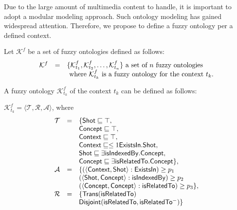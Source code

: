			Due to the large amount of multimedia content to handle, it is important to adopt a 
			modular modeling approach. Such ontology modeling has gained widespread attention. 
			Therefore, we propose to define a fuzzy ontology per a defined context.

			Let $\mathcal{K}^{f}$ be a set of fuzzy ontologies defined as follows:
			\begin{equation}
				\begin{array}{ c c l }
					\mathcal{K}^{f} & = &  \{\mathcal{K}^{f}_{t_{1}},\mathcal{K}^{f}_{t_{2}}, 
					\ldots, \mathcal{K}^{f}_{t_{n}}\} \text{ a set of $n$ fuzzy ontologies }  \\
					& &  \text{ where } \mathcal{K}^{f}_{t_{k}} \text{ is a fuzzy ontology for the context } t_{k}.
				\end{array}
			\end{equation}
			
			\begin{definition}
				A fuzzy ontology $\mathcal{K}^{f}_{t_{k}}$ of the context $t_{k}$ can be defined as follows: 

				$\mathcal{K}^{f}_{t_{k}} = \langle \mathcal{T}, \mathcal{R}, \mathcal{A} \rangle$, where
				{
					\begin{equation}
						\begin{array}{ c c l }
							\mathcal{T}  	& = 	& \{\mathsf{Shot} \sqsubseteq \top,\\
							&	& \mathsf{Concept} \sqsubseteq \top,\\
							&	& \mathsf{Context} \sqsubseteq \top,\\
							&	& \mathsf{Context}\sqsubseteq\leq{}1\mathsf{ExistsIn.Shot},\\
							&	& \mathsf{Shot}\sqsubseteq\exists\mathsf{isIndexedBy.Concept},\\
							&	& \mathsf{Concept} \sqsubseteq \exists{}\mathsf{isRelatedTo.Concept}\},\\
							\mathcal{A}	& = 	&
							\{(\langle{}\mathsf{Context},\mathsf{Shot}\rangle:\mathsf{ExistsIn})\geq
							p_{1}\\
							&	& (\langle{}\mathsf{Shot},\mathsf{Concept}\rangle:
							\mathsf{isIndexedBy}) \geq	p_{2}\\
							&	& (\langle{}\mathsf{Concept},\mathsf{Concept}\rangle:\mathsf{isRelatedTo})
							\geq p_{3}\},\\
							\mathcal{R} 	& =	& \{\mathsf{Trans(isRelatedTo)} \\
							&	& \mathsf{Disjoint(isRelatedTo,isRelatedTo^{-})}\}
						\end{array}
					\end{equation}
				}
			\end{definition}
		
